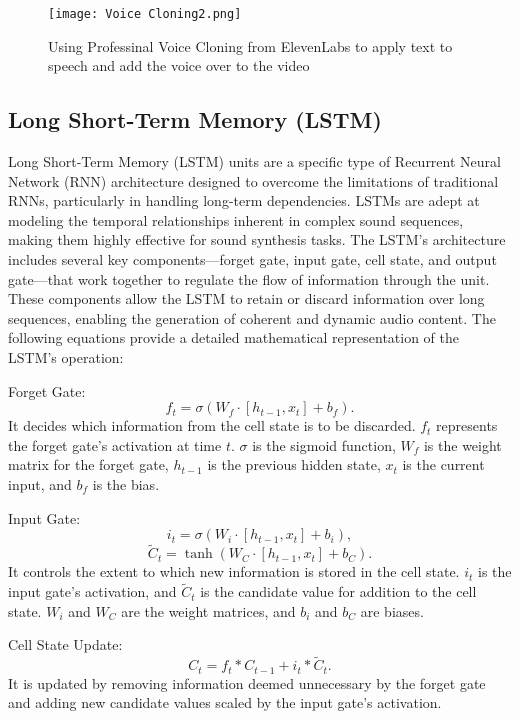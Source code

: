 \documentclass[11pt,a4paper,oneside]{report}
\begin{document}
\begin{figure}[htbp]
  \centering
  \texttt{[image: Voice Cloning2.png]}
  \caption{Using Professinal Voice Cloning from ElevenLabs to apply text to speech and add the voice over to the video}
\end{figure}

\subsection{Long Short-Term Memory (LSTM)}

Long Short-Term Memory (LSTM) units are a specific type of Recurrent Neural Network (RNN) architecture designed to overcome the limitations of traditional RNNs, particularly in handling long-term dependencies. LSTMs are adept at modeling the temporal relationships inherent in complex sound sequences, making them highly effective for sound synthesis tasks. The LSTM's architecture includes several key components—forget gate, input gate, cell state, and output gate—that work together to regulate the flow of information through the unit. These components allow the LSTM to retain or discard information over long sequences, enabling the generation of coherent and dynamic audio content. The following equations provide a detailed mathematical representation of the LSTM's operation:

Forget Gate:
\begin{equation}
f_t = \sigma(W_{f} \cdot [h_{t-1}, x_t] + b_f).
\end{equation}
It decides which information from the cell state is to be discarded. $f_t$ represents the forget gate's activation at time $t$. $\sigma$ is the sigmoid function, $W_{f}$ is the weight matrix for the forget gate, $h_{t-1}$ is the previous hidden state, $x_t$ is the current input, and $b_f$ is the bias.

Input Gate:
\begin{equation}
i_t = \sigma(W_{i} \cdot [h_{t-1}, x_t] + b_i),
\end{equation}
\begin{equation}
\tilde{C}_t = \tanh(W_{C} \cdot [h_{t-1}, x_t] + b_C).
\end{equation}
It controls the extent to which new information is stored in the cell state. $i_t$ is the input gate's activation, and $\tilde{C}_t$ is the candidate value for addition to the cell state. $W_{i}$ and $W_{C}$ are the weight matrices, and $b_i$ and $b_C$ are biases.

Cell State Update:
\begin{equation}
C_t = f_t \ast C_{t-1} + i_t \ast \tilde{C}_t.
\end{equation}
It is updated by removing information deemed unnecessary by the forget gate and adding new candidate values scaled by the input gate's activation.
\end{document}
